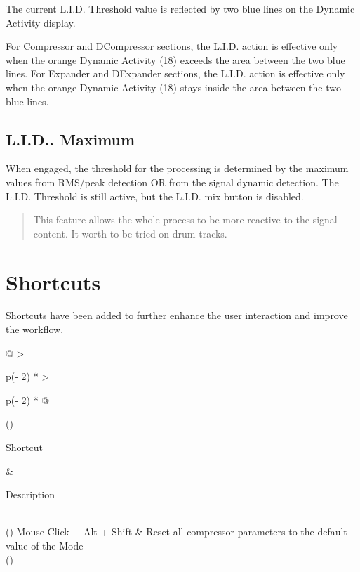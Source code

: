 \documentclass[
  letterpaper,
  DIV=11,
  numbers=noendperiod]{scrreport}
\begin{document}
The current L.I.D. Threshold value is reflected by two blue lines on the
Dynamic Activity display.

For Compressor and DCompressor sections, the L.I.D. action is effective
only when the orange Dynamic Activity (18) exceeds the area between the
two blue lines. For Expander and DExpander sections, the L.I.D. action
is effective only when the orange Dynamic Activity (18) stays inside the
area between the two blue lines.

\hypertarget{l.i.d..-maximum}{%
\section{L.I.D.. Maximum}\label{l.i.d..-maximum}}

When engaged, the threshold for the processing is determined by the
maximum values from RMS/peak detection OR from the signal dynamic
detection. The L.I.D. Threshold is still active, but the L.I.D. mix
button is disabled.

\begin{quote}
This feature allows the whole process to be more reactive to the signal
content. It worth to be tried on drum tracks.
\end{quote}


\hypertarget{shortcuts}{%
\chapter{Shortcuts}\label{shortcuts}}

Shortcuts have been added to further enhance the user interaction and
improve the workflow.

\begin{longtable}[]{@{}
  >{\raggedright\arraybackslash}p{(\columnwidth - 2\tabcolsep) * }
  >{\raggedright\arraybackslash}p{(\columnwidth - 2\tabcolsep) * }@{}}
\toprule()
\begin{minipage}[b]{\linewidth}\raggedright
Shortcut
\end{minipage} & \begin{minipage}[b]{\linewidth}\raggedright
Description
\end{minipage} \\
\midrule()
\endhead
Mouse Click + Alt + Shift & Reset all compressor parameters to the
default value of the Mode \\
\bottomrule()
\end{longtable}
\end{document}
